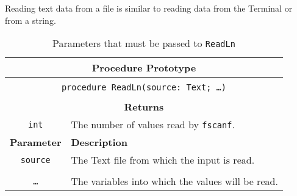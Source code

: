 Reading text data from a file is similar to reading data from the Terminal or from a string.

\begin{table}[h]
  \centering
  \begin{tabular}{|c|p{9.5cm}|}
    \hline
    \multicolumn{2}{|c|}{\textbf{Procedure Prototype}} \\
    \hline
    \multicolumn{2}{|c|}{} \\
    \multicolumn{2}{|c|}{\texttt{procedure ReadLn(source: Text; \ldots )}} \\
    \multicolumn{2}{|c|}{} \\
    \hline
    \multicolumn{2}{|c|}{\textbf{Returns}} \\
    \hline
    \texttt{int} & The number of values read by \texttt{fscanf}. \\
    \hline
    \textbf{Parameter} & \textbf{Description} \\
    \hline
    \texttt{ source } & The Text file from which the input is read.\\
    & \\
    \texttt{\ldots}   & The variables into which the values will be read. \\
    \hline
  \end{tabular}
  \caption{Parameters that must be passed to \texttt{ReadLn}}
  \label{tbl:File Readln}
\end{table}






